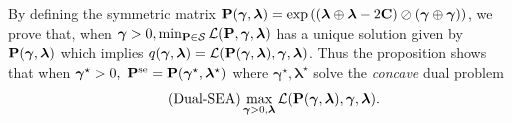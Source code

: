 By defining the symmetric matrix $\mathbf{P}(\bm{\gamma}, \bm{\lambda}) = 
\exp{\left(\left(\boldsymbol{\lambda}\oplus \boldsymbol{\lambda}- 2 \mathbf{C}\right) \oslash \left(\bm{\gamma} \oplus \bm{\gamma} \right) \right)}$, we prove that, when $\bm{\gamma}>0, \min_{\mathbf{P} \in \mathcal{S}} \mathcal{L}(\mathbf{P}, \bm{\gamma}, \bm{\lambda})$ has a unique solution given by $\mathbf{P}(\bm{\gamma}, \bm{\lambda})$ which implies $q(\boldsymbol{\gamma}, \boldsymbol{\lambda}) = \mathcal{L}(\mathbf{P}(\bm{\gamma}, \bm{\lambda}), \boldsymbol{\gamma}, \boldsymbol{\lambda})$. Thus the proposition shows that when $\bm{\gamma}^\star > 0, \ \mathbf{P}^{\mathrm{se}} = \mathbf{P}(\bm{\gamma}^\star, \bm{\lambda}^\star)$ where $\bm{\gamma}^\star, \bm{\lambda}^\star$ solve the \emph{concave} dual problem 
\begin{equation}
\label{eq:dual_problem}
\tag{Dual-SEA}
\max_{\bm{\gamma} > 0, \boldsymbol{\lambda}} \mathcal{L}(\mathbf{P}(\bm{\gamma}, \bm{\lambda}), \bm{\gamma}, \bm{\lambda}). 
\end{equation}

